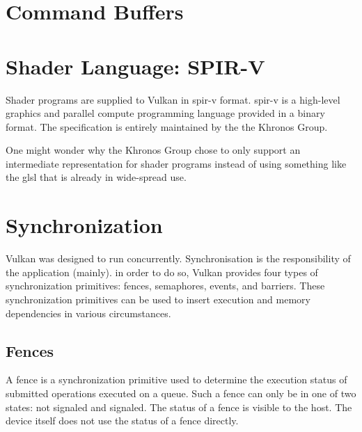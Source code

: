   \section{Command Buffers}
  \label{sec:CommandBuffers}
    \lipsum

  \section{Shader Language: SPIR-V}

    Shader programs are supplied to Vulkan in \acrfull{spir-v} format. \acrshort{spir-v} is a high-level graphics and parallel compute programming language provided in a binary format. The specification is entirely maintained by the the Khronos Group.


    One might wonder why the Khronos Group chose to only support an intermediate representation for shader programs instead of using something like the \acrfull{glsl} that is already in wide-spread use. 

  \section{Synchronization}

    Vulkan was designed to run concurrently. Synchronisation is the responsibility of the application (mainly). in order to do so, Vulkan provides four types of synchronization primitives: fences, semaphores, events, and barriers. These synchronization primitives can be used to insert execution and memory dependencies in various circumstances.


    \subsection{Fences}
    \label{sub:Fences}
      A fence is a synchronization primitive used to determine the execution status of submitted operations executed on a queue. Such a fence can only be in one of two states: not signaled and signaled. The status of a fence is visible to the host. The device itself does not use the status of a fence directly.

